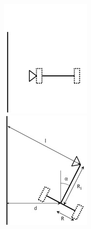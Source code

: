 \begin{figure}[h!]
	\begin{minipage}[h!]{0.5\linewidth}
		\begin{center}
			\includegraphics[width=0.8\linewidth]{chapters/chapter15/images/2}
			\caption{}
			\label{ris:image15x2}
		\end{center}
	\end{minipage}
	\begin{minipage}[h!]{0.5\linewidth}
		\begin{center}
			\includegraphics[width=0.8\linewidth]{chapters/chapter15/images/3}
			\caption{}
			\label{ris:image15x3}
		\end{center}
	\end{minipage}
\end{figure}

